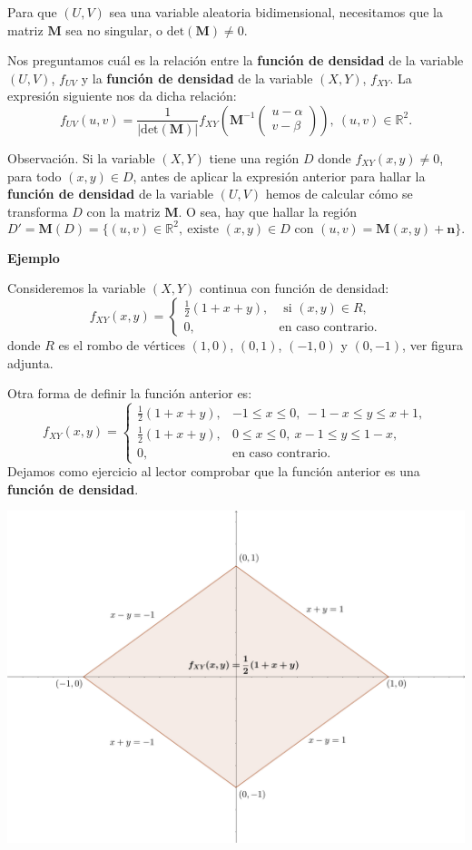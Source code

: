 \documentclass[]{book}
\begin{document}
Para que \((U,V)\) sea una variable aleatoria bidimensional, necesitamos que la matriz \(\mathbf{M}\) sea no singular, o \(\mathrm{det}(\mathbf{M})\neq 0\).

Nos preguntamos cuál es la relación entre la \textbf{función de densidad} de la variable \((U,V)\), \(f_{UV}\) y la \textbf{función de densidad} de la variable \((X,Y)\), \(f_{XY}\). La expresión siguiente nos da dicha relación:
\[
f_{UV}(u,v)=\frac{1}{|\mathrm{det}(\mathbf{M})|}f_{XY}\left(\mathbf{M}^{-1}\begin{pmatrix}u-\alpha\\ v-\beta\end{pmatrix}\right), \ (u,v)\in\mathbb{R}^2.
\]

Observación.
Si la variable \((X,Y)\) tiene una región \(D\) donde \(f_{XY}(x,y)\neq 0\), para todo \((x,y)\in D\), antes de aplicar la expresión anterior para hallar la \textbf{función de densidad} de la variable \((U,V)\) hemos de calcular cómo se transforma \(D\) con la matriz \(\mathbf{M}\). O sea, hay que hallar la región
\[
D'=\mathbf{M}(D)=\{(u,v)\in\mathbb{R}^2,\ \mbox{existe $(x,y)\in D$ con } (u,v)=\mathbf{M}(x,y)+\mathbf{n}\}.
\]

\textbf{Ejemplo}

Consideremos la variable \((X,Y)\) continua con función de densidad:
\[
f_{XY}(x,y)=\begin{cases}
\frac{1}{2}(1+x+y), & \mbox{ si }(x,y)\in R, \\
0, & \mbox{en caso contrario.}
\end{cases}
\]
donde \(R\) es el rombo de vértices \((1,0)\), \((0,1)\), \((-1,0)\) y \((0,-1)\), ver figura adjunta.

Otra forma de definir la función anterior es:
\[
f_{XY}(x,y)=\begin{cases}
\frac{1}{2}(1+x+y), & -1\leq x\leq 0,\ -1-x\leq y\leq x+1, \\
\frac{1}{2}(1+x+y), & 0\leq x\leq 0,\ x-1\leq y\leq 1-x, \\
0, & \mbox{en caso contrario.}
\end{cases}
\]
Dejamos como ejercicio al lector comprobar que la función anterior es una \textbf{función de densidad}.

\includegraphics{Images/EjTranLineal.png}
\end{document}

